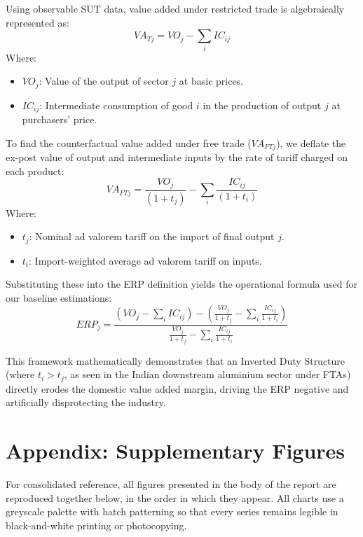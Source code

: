 \documentclass[11pt, a4paper]{article}
\numberwithin{figure}{section}
\numberwithin{table}{section}
\begin{document}
Using observable SUT data, value added under restricted trade is algebraically represented as:
$$ VA_{Tj} = VO_j - \sum_i IC_{ij} $$
Where:
\begin{itemize}
    \item $VO_j$: Value of the output of sector $j$ at basic prices.
    \item $IC_{ij}$: Intermediate consumption of good $i$ in the production of output $j$ at purchasers' price.
\end{itemize}

To find the counterfactual value added under free trade ($VA_{FTj}$), we deflate the ex-post value of output and intermediate inputs by the rate of tariff charged on each product:
$$ VA_{FTj} = \frac{VO_j}{(1+t_j)} - \sum_i \frac{IC_{ij}}{(1+t_i)} $$
Where:
\begin{itemize}
    \item $t_j$: Nominal ad valorem tariff on the import of final output $j$.
    \item $t_i$: Import-weighted average ad valorem tariff on inputs.
\end{itemize}

Substituting these into the ERP definition yields the operational formula used for our baseline estimations:
$$ ERP_j = \frac{ \left(VO_j - \sum_i IC_{ij}\right) - \left( \frac{VO_j}{1+t_j} - \sum_i \frac{IC_{ij}}{1+t_i} \right) }{ \frac{VO_j}{1+t_j} - \sum_i \frac{IC_{ij}}{1+t_i} } $$

This framework mathematically demonstrates that an Inverted Duty Structure (where $t_i > t_j$, as seen in the Indian downstream aluminium sector under FTAs) directly erodes the domestic value added margin, driving the ERP negative and artificially disprotecting the industry.

\newpage
\section{Appendix: Supplementary Figures}
\label{app:figures}

For consolidated reference, all figures presented in the body of the report are reproduced together below, in the order in which they appear. All charts use a greyscale palette with hatch patterning so that every series remains legible in black-and-white printing or photocopying.
\end{document}
